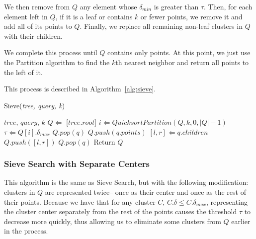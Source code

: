 We then remove from $Q$ any element whose $\delta_{min}$ is greater than $\tau$. Then, for each element left 
in $Q$, if it is a leaf or contains $k$ or fewer points, we remove it and add all of its points to $Q$. Finally, we
replace all remaining non-leaf clusters in $Q$ with their children. 

We complete this process until $Q$ contains only points. At this point, we 
just use the Partition algorithm to find the $k$th 
nearest neighbor and return all points to the left of it. 

This process is described in Algorithm~\ref{alg:sieve}. 

\begin{algorithm} %
    \caption{Sieve(\emph{tree, query, k})} %
    \label{alg:sieve} %
    \begin{algorithmic} %
        \REQUIRE $tree$, $query$, $k$
        \STATE $Q \Leftarrow$ [$tree.root$]
            \STATE $i \Leftarrow QuicksortPartition(Q, k, 0, |Q| - 1)$
            \STATE $\tau \Leftarrow Q[i].\delta_{max}$
                    \STATE $Q.pop(q)$
                \ENDIF
            \ENDFOR
                    \STATE $Q.push(q.points)$
                \ELSE
                    \STATE $[l, r] \Leftarrow q.children$
                    \STATE $Q.push([l, r])$   
                \ENDIF
                \STATE $Q.pop(q)$
            \ENDFOR 
        \ENDWHILE
        \STATE Return $Q$
    \end{algorithmic}
    \end{algorithm}

\subsubsection{Sieve Search with Separate Centers}
\label{subsubsec:methods:knn-search:sieve2}
This algorithm is the same as Sieve Search, but with the following modification: clusters 
in $Q$ are represented twice-- once as their center and once as the rest of their points. 
Because we have that for any cluster $C$, $C.\delta \leq C.\delta_{max}$, representing the cluster 
center separately from the rest of the points causes the threshold $\tau$ to decrease more quickly, 
thus allowing us to eliminate some clusters from $Q$ earlier in the process. 

